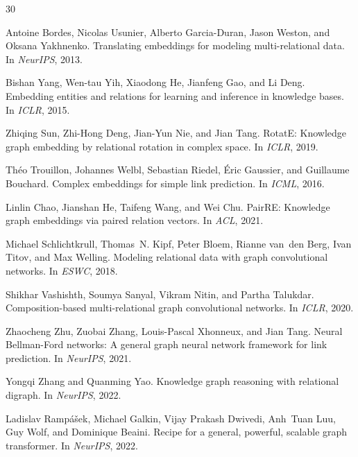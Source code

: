 \documentclass{article}
\begin{document}
\begin{thebibliography}{30}

Antoine Bordes, Nicolas Usunier, Alberto Garcia-Duran, Jason Weston, and Oksana Yakhnenko.
\newblock Translating embeddings for modeling multi-relational data.
\newblock In \emph{NeurIPS}, 2013.

Bishan Yang, Wen-tau Yih, Xiaodong He, Jianfeng Gao, and Li Deng.
\newblock Embedding entities and relations for learning and inference in knowledge bases.
\newblock In \emph{ICLR}, 2015.

Zhiqing Sun, Zhi-Hong Deng, Jian-Yun Nie, and Jian Tang.
\newblock RotatE: Knowledge graph embedding by relational rotation in complex space.
\newblock In \emph{ICLR}, 2019.

Th{\'e}o Trouillon, Johannes Welbl, Sebastian Riedel, {\'E}ric Gaussier, and Guillaume Bouchard.
\newblock Complex embeddings for simple link prediction.
\newblock In \emph{ICML}, 2016.

Linlin Chao, Jianshan He, Taifeng Wang, and Wei Chu.
\newblock PairRE: Knowledge graph embeddings via paired relation vectors.
\newblock In \emph{ACL}, 2021.

Michael Schlichtkrull, Thomas~N. Kipf, Peter Bloem, Rianne van~den Berg, Ivan Titov, and Max Welling.
\newblock Modeling relational data with graph convolutional networks.
\newblock In \emph{ESWC}, 2018.

Shikhar Vashishth, Soumya Sanyal, Vikram Nitin, and Partha Talukdar.
\newblock Composition-based multi-relational graph convolutional networks.
\newblock In \emph{ICLR}, 2020.

Zhaocheng Zhu, Zuobai Zhang, Louis-Pascal Xhonneux, and Jian Tang.
\newblock Neural Bellman-Ford networks: A general graph neural network framework for link prediction.
\newblock In \emph{NeurIPS}, 2021.

Yongqi Zhang and Quanming Yao.
\newblock Knowledge graph reasoning with relational digraph.
\newblock In \emph{NeurIPS}, 2022.

Ladislav Ramp{\'a}{\v{s}}ek, Michael Galkin, Vijay Prakash Dwivedi, Anh~Tuan Luu, Guy Wolf, and Dominique Beaini.
\newblock Recipe for a general, powerful, scalable graph transformer.
\newblock In \emph{NeurIPS}, 2022.


\end{thebibliography}
\end{document}
